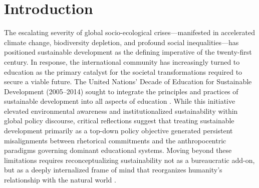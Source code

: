 \documentclass[pdflatex,sn-basic]{sn-jnl}%
\begin{document}

\maketitle


\section{Introduction}
\label{sec:introduccion}

The escalating severity of global socio-ecological crises---manifested in accelerated climate change, biodiversity depletion, and profound social inequalities---has positioned sustainable development as the defining imperative of the twenty-first century. In response, the international community has increasingly turned to education as the primary catalyst for the societal transformations required to secure a viable future. The United Nations' Decade of Education for Sustainable Development (2005--2014) sought to integrate the principles and practices of sustainable development into all aspects of education \cite{grabovska_implementing_2009, ozturk_education_2017}. While this initiative elevated environmental awareness and institutionalized sustainability within global policy discourse, critical reflections suggest that treating sustainable development primarily as a top-down policy objective generated persistent misalignments between rhetorical commitments and the anthropocentric paradigms governing dominant educational systems. Moving beyond these limitations requires reconceptualizing sustainability not as a bureaucratic add-on, but as a deeply internalized frame of mind that reorganizes humanity's relationship with the natural world \cite{ontong_reconceptualisation_2015, martin_divergent_2013}.
\end{document}
